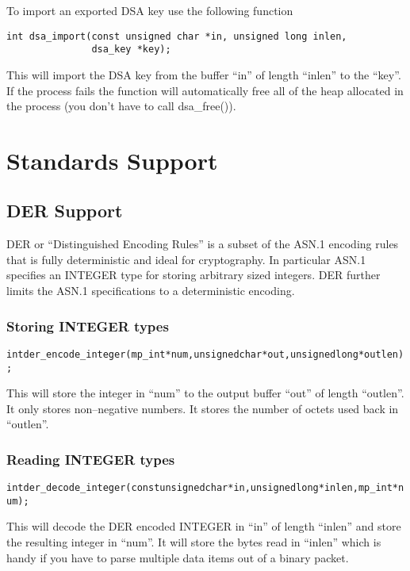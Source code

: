 \documentclass[a4paper]{book}
\begin{document}
To import an exported DSA key use the following function

\begin{verbatim}
int dsa_import(const unsigned char *in, unsigned long inlen, 
               dsa_key *key);
\end{verbatim}

This will import the DSA key from the buffer ``in'' of length ``inlen'' to the ``key''.  If the process fails the function
will automatically free all of the heap allocated in the process (you don't have to call dsa\_free()).  

\chapter{Standards Support}
\section{DER Support}
DER or ``Distinguished Encoding Rules'' is a subset of the ASN.1 encoding rules that is fully deterministic and
ideal for cryptography.  In particular ASN.1 specifies an INTEGER type for storing arbitrary sized integers.  DER
further limits the ASN.1 specifications to a deterministic encoding.

\subsection{Storing INTEGER types}
\begin{alltt}
int der_encode_integer(mp_int *num, unsigned char *out, unsigned long *outlen);
\end{alltt}

This will store the integer in ``num'' to the output buffer ``out'' of length ``outlen''.  It only stores
non--negative numbers.  It stores the number of octets used back in ``outlen''.

\subsection{Reading INTEGER types}
\begin{alltt}
int der_decode_integer(const unsigned char *in, unsigned long *inlen, mp_int *num);
\end{alltt}
This will decode the DER encoded INTEGER in ``in'' of length ``inlen'' and store the resulting integer
in ``num''.  It will store the bytes read in ``inlen'' which is handy if you have to parse multiple
data items out of a binary packet.
\end{document}
